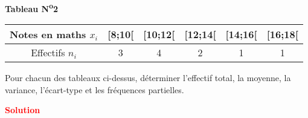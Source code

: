 \documentclass[12pt,a4paper]{article}
\begin{document}
\vspace{1cm}

\begin{center}
\textbf{Tableau N\textsuperscript{o}2}

\vspace{0.2cm}
\begin{tabular}{|c|c|c|c|c|c|}
\hline
Notes en maths \( x_i \) & [8;10[ & [10;12[ & [12;14[ & [14;16[ & [16;18[ \\
\hline
Effectifs \( n_i \) & 3 & 4 & 2 & 1 & 1 \\
\hline
\end{tabular}
\end{center}

\vspace{0.5cm}

\noindent
Pour chacun des tableaux ci-dessus, déterminer l’effectif total, la moyenne, la variance, l’écart-type et les fréquences partielles.

\noindent
\textbf{\textcolor{red}{Solution}}
\end{document}
